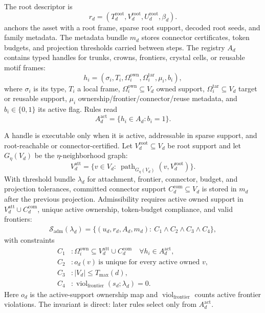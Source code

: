 \documentclass[acmtog,anonymous,review]{acmart}
\begin{document}
The root descriptor is
\begin{equation}
r_d=(T_d^{\mathrm{root}},V_d^{\mathrm{root}},U_d^{\mathrm{root}},\beta_d).
\end{equation}
anchors the asset with a root frame, sparse root support, decoded root seeds, and family metadata. The metadata bundle $m_d$ stores connector certificates, token budgets, and projection thresholds carried between steps. The registry $A_d$ contains typed handles for trunks, crowns, frontiers, crystal cells, or reusable motif frames:
\begin{equation}
h_i=(\sigma_i,T_i,\Omega_i^{\mathrm{own}},\Omega_i^{\mathrm{tar}},\mu_i,b_i),
\end{equation}
where $\sigma_i$ is its type, $T_i$ a local frame, $\Omega_i^{\mathrm{own}}\subseteq V_d$ owned support, $\Omega_i^{\mathrm{tar}}\subseteq V_d$ target or reusable support, $\mu_i$ ownership/frontier/connector/reuse metadata, and $b_i\in\{0,1\}$ its active flag. Rules read
\begin{equation}
A_d^{\mathrm{act}}=\{h_i\in A_d:b_i=1\}.
\end{equation}

A handle is executable only when it is active, addressable in sparse support, and root-reachable or connector-certified. Let $V_d^{\mathrm{root}}\subseteq V_d$ be root support and let $G_\eta(V_d)$ be the $\eta$-neighborhood graph:
\begin{equation}
V_d^{\mathrm{att}}=
\{v\in V_d:\ \operatorname{path}_{G_\eta(V_d)}(v,V_d^{\mathrm{root}})\}.
\end{equation}
With threshold bundle $\lambda_d$ for attachment, frontier, connector, budget, and projection tolerances, committed connector support $C_d^{\mathrm{com}}\subseteq V_d$ is stored in $m_d$ after the previous projection. Admissibility requires active owned support in $V_d^{\mathrm{att}}\cup C_d^{\mathrm{com}}$, unique active ownership, token-budget compliance, and valid frontiers:
\begin{equation}
\begin{aligned}
\mathcal S_{\mathrm{adm}}(\lambda_d)
=
\{(u_d,r_d,A_d,m_d):\ C_1\land C_2\land C_3\land C_4\},
\end{aligned}
\end{equation}
with constraints
\begin{equation}
\begin{aligned}
C_1 &: \Omega_i^{\mathrm{own}}\subseteq
V_d^{\mathrm{att}}\cup C_d^{\mathrm{com}}
\quad \forall h_i\in A_d^{\mathrm{act}},\\
C_2 &: o_d(v)\ \text{is unique for every active owned } v,\\
C_3 &: |V_d|\le T_{\max}(d),\\
C_4 &: \operatorname{viol}_{\mathrm{frontier}}(s_d;\lambda_d)=0.
\end{aligned}
\end{equation}
Here $o_d$ is the active-support ownership map and $\operatorname{viol}_{\mathrm{frontier}}$ counts active frontier violations. The invariant is direct: later rules select only from $A_d^{\mathrm{act}}$.
\end{document}
